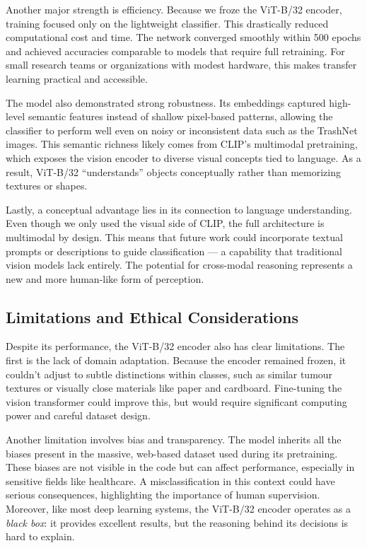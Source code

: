 \documentclass[12pt]{article}
\begin{document}
Another major strength is efficiency. Because we froze the ViT-B/32 encoder, training focused only on the lightweight classifier. This drastically reduced computational cost and time. The network converged smoothly within 500 epochs and achieved accuracies comparable to models that require full retraining. For small research teams or organizations with modest hardware, this makes transfer learning practical and accessible.

The model also demonstrated strong robustness. Its embeddings captured high-level semantic features instead of shallow pixel-based patterns, allowing the classifier to perform well even on noisy or inconsistent data such as the TrashNet images. This semantic richness likely comes from CLIP’s multimodal pretraining, which exposes the vision encoder to diverse visual concepts tied to language. As a result, ViT-B/32 “understands” objects conceptually rather than memorizing textures or shapes.

Lastly, a conceptual advantage lies in its connection to language understanding. Even though we only used the visual side of CLIP, the full architecture is multimodal by design. This means that future work could incorporate textual prompts or descriptions to guide classification — a capability that traditional vision models lack entirely. The potential for cross-modal reasoning represents a new and more human-like form of perception.

\subsection{Limitations and Ethical Considerations}
Despite its performance, the ViT-B/32 encoder also has clear limitations. The first is the lack of domain adaptation. Because the encoder remained frozen, it couldn’t adjust to subtle distinctions within classes, such as similar tumour textures or visually close materials like paper and cardboard. Fine-tuning the vision transformer could improve this, but would require significant computing power and careful dataset design.

Another limitation involves bias and transparency. The model inherits all the biases present in the massive, web-based dataset used during its pretraining. These biases are not visible in the code but can affect performance, especially in sensitive fields like healthcare. A misclassification in this context could have serious consequences, highlighting the importance of human supervision. Moreover, like most deep learning systems, the ViT-B/32 encoder operates as a \textit{black box}: it provides excellent results, but the reasoning behind its decisions is hard to explain.
\end{document}
